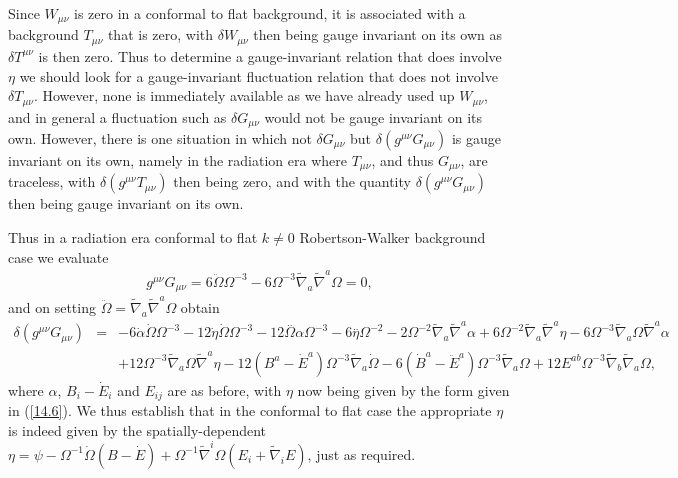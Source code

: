 \documentclass[aps,onecolumn,10pt]{revtex4}
\numberwithin{equation}{section}
\numberwithin{equation}{section}
\begin{document}
Since $W_{\mu\nu}$ is zero in a conformal to flat background, it is associated with a background $T_{\mu\nu}$ that is zero, with $\delta W_{\mu\nu}$ then being gauge invariant on its own as $\delta T^{\mu\nu}$ is then zero. Thus to determine a gauge-invariant relation that does involve $\eta$ we should look for a gauge-invariant fluctuation relation that does not involve $\delta T_{\mu\nu}$. However, none is immediately available as we have already used up $W_{\mu\nu}$, and in general a fluctuation such as $\delta G_{\mu\nu}$ would not be gauge invariant on its own. However, there is one situation in which not $\delta G_{\mu\nu}$ but  $\delta(g^{\mu\nu}G_{\mu\nu})$ is gauge invariant on its own, namely in the radiation era where $T_{\mu\nu}$, and thus $G_{\mu\nu}$, are traceless, with $\delta (g^{\mu\nu}T_{\mu\nu})$ then being zero, and with the quantity $\delta(g^{\mu\nu}G_{\mu\nu})$ then being gauge invariant on its own.

Thus in a radiation era conformal to flat $k\neq 0$ Robertson-Walker background case we evaluate 
%
\begin{eqnarray}
g^{\mu\nu}G_{\mu\nu}=6\ddot{\Omega}\Omega^{-3}-6\Omega^{-3}\tilde{\nabla}_a\tilde{\nabla}^a\Omega=0,
\label{14.10}
\end{eqnarray}
%
and on setting $\ddot{\Omega}=\tilde{\nabla}_a\tilde{\nabla}^a\Omega$ obtain 
%
\begin{eqnarray}
\delta(g^{\mu\nu} G_{\mu\nu})&=& -6 \dot{\alpha} \dot{\Omega} \Omega^{-3} - 12 \dot{\eta} \dot{\Omega} \Omega^{-3} - 12 \overset{..}{\Omega} \alpha \Omega^{-3} - 6 \overset{..}{\eta} \Omega^{-2} - 2 \Omega^{-2} \tilde{\nabla}_{a}\tilde{\nabla}^{a}\alpha + 6 \Omega^{-2} \tilde{\nabla}_{a}\tilde{\nabla}^{a}\eta  - 6 \Omega^{-3} \tilde{\nabla}_{a}\Omega \tilde{\nabla}^{a}\alpha
\nonumber \\ 
&& + 12 \Omega^{-3} \tilde{\nabla}_{a}\Omega \tilde{\nabla}^{a}\eta -12 (B^{a}-\dot{E}^a) \Omega^{-3} \tilde{\nabla}_{a}\dot{\Omega} - 6 (\dot{B}^{a}-\ddot{E}^a) \Omega^{-3} \tilde{\nabla}_{a}\Omega +12 E^{ab} \Omega^{-3} \tilde{\nabla}_{b}\tilde{\nabla}_{a}\Omega,
\label{14.11}
\end{eqnarray}
%
where $\alpha$, $B_i-\dot{E}_i$ and $E_{ij}$ are as before, with $\eta$ now being given by the form given in (\ref{14.6}). We thus establish that in the conformal to flat case the appropriate $\eta$ is indeed given by the spatially-dependent $\eta=\psi -\Omega^{-1}\dot{\Omega}(B-\dot E)+\Omega^{-1}\tilde\nabla^i\Omega(E_i+\tilde\nabla_i E)$, just as required.
\end{document}
